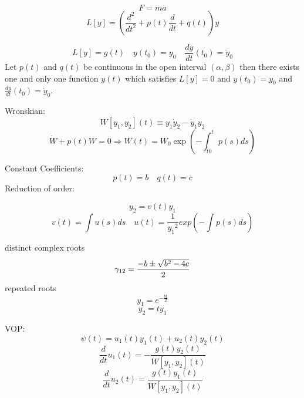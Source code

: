 \[
  F = m a
\]
\[
  L[y] =  \left( \frac{d^2}{dt^2} + p(t) \frac{d}{dt} + q(t) \right) y
\]

\[
  L[y] = g(t) \quad y(t_0) = y_0 \quad \frac{dy}{dt} (t_0) = {\dot y}_0
\]
Let $p(t)$ and $q(t)$ be continuous in the open interval $(\alpha,\beta)$ then
there exists one and only one function $y(t)$ which satisfies $L[y] = 0$ and
$y(t_0) = y_0$ and $\frac{dy}{dt}(t_0) = {\dot y}_0$.

Wronskian:
\[
  W[y_1,y_2](t) \equiv y_1 {\dot y}_2 - {\dot y}_1 y_2
\]
\[
  {\dot W} + p(t) W = 0 \Rightarrow W(t) = W_0 \exp \left( -\int_{t0}^{t} p(s) ds \right)
\]

Constant Coefficients:
\[
  p(t) = b \quad q(t) = c
\]
Reduction of order:

\[
  y_2 =v(t) y_1
\]
\[
  v(t) = \int u(s) ds \quad u(t) = \frac{1}{{y_1}^2} exp\left( -\int p(s) ds \right)
\]

distinct complex roots
\[
  \gamma_{1\\2} = \frac{-b \pm \sqrt{b^2 - 4c}}{2}
\]
repeated roots
\[
  y_1 = e^{-\frac{b t}{2}}
\]
\[
  y_2 = t y_1
\]

VOP:
\[
  \psi(t) = u_1(t) y_1(t) + u_2(t) y_2(t)
\]
\[
  \frac{d}{dt} u_1(t) = - \frac{ g(t) y_2(t) }{ W\left[y_1,y_2\right](t) }
\]
\[
  \frac{d}{dt} u_2(t) =   \frac{ g(t) y_1(t) }{ W\left[y_1,y_2\right](t) }
\]

